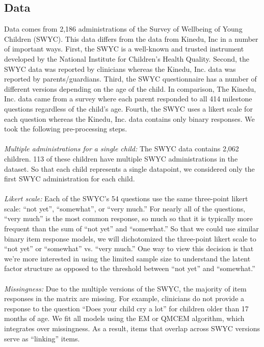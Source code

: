 \documentclass[9pt,twoside,lineno]{pnas-new}
\begin{document}
\subsection*{Data}
Data comes from 2,186 administrations of the Survey of Wellbeing of Young Children (SWYC). This data differs from the data from Kinedu, Inc in a number of important ways. First, the SWYC is a well-known and trusted instrument developed by the National Institute for Children’s Health Quality. Second, the SWYC data was reported by clinicians whereas the Kinedu, Inc. data was reported by parents/guardians. Third, the SWYC questionnaire has a number of different versions depending on the age of the child. In comparison, The Kinedu, Inc. data came from a survey where each parent responded to all 414 milestone questions regardless of the child’s age. Fourth, the SWYC uses a likert scale for each question whereas the Kinedu, Inc. data contains only binary responses. We took the following pre-processing steps.
\\\\
\textit{Multiple administrations for a single child:} The SWYC data contains 2,062 children. 113 of these children have multiple SWYC administrations in the dataset. So that each child represents a single datapoint, we considered only the first SWYC administration for each child.
\\\\
\textit{Likert scale:} Each of the SWYC's 54 questions use the same three-point likert scale: “not yet”, “somewhat”, or “very much.” For nearly all of the questions, “very much” is the most common response, so much so that it is typically more frequent than the sum of “not yet” and “somewhat.” So that we could use similar binary item response models, we will dichotomized the three-point likert scale to “not yet” or “somewhat” vs. “very much.” One way to view this decision is that we’re more interested in using the limited sample size to understand the latent factor structure as opposed to the threshold between “not yet” and “somewhat.”
\\\\
\textit{Missingness:} Due to the multiple versions of the SWYC, the majority of item responses in the matrix are missing. For example, clinicians do not provide a response to the question “Does your child cry a lot” for children older than 17 months of age. We fit all models using the EM or QMCEM algorithm, which integrates over missingness. As a result, items that overlap across SWYC versions serve as “linking” items.
\end{document}

